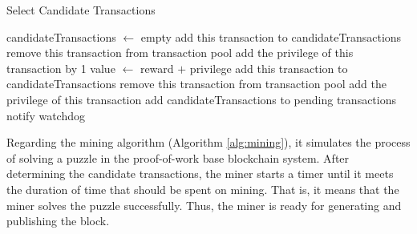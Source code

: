 \clearpage
\vspace*{\fill}
\begin{algorithm}[htb]
    \caption{Select Candidate Transactions}
    \label{alg:select candidate transactions}
\begin{algorithmic}[1]
    \State candidateTransactions $\gets$ empty
    \State
                \State add this transaction to candidateTransactions
                \State remove this transaction from transaction pool
            \Else
                \State add the privilege of this transaction by 1
            \EndIf
        \EndFor
            \State value $\gets$ reward $+$ privilege
                \State add this transaction to candidateTransactions
                \State remove this transaction from transaction pool
            \Else
                \State add the privilege of this transaction
            \EndIf
        \EndFor
    \EndIf
    \State
        \State {}
    \Else
        \State add candidateTransactions to pending transactions
    \EndIf
    \State
    \State notify watchdog
    \EndProcedure
\end{algorithmic}
\end{algorithm}
\vspace*{\fill}

\clearpage

Regarding the mining algorithm (Algorithm \ref{alg:mining}), it simulates the process of solving a puzzle in the proof-of-work base blockchain system. After determining the candidate transactions, the miner starts a timer until it meets the duration of time that should be spent on mining. That is, it means that the miner solves the puzzle successfully. Thus, the miner is ready for generating and publishing the block.

